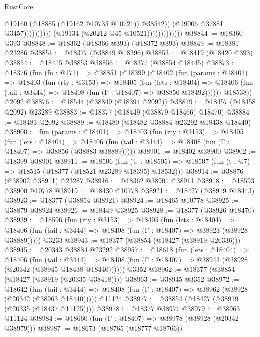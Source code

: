 \begin{lexlean}{RustCore}
\begin{coremodule}
                                                @19160
                                                (@18885 (@19162 @10735 @10721))
                                                @38542))
                                            (@19006 @37881 @3457))))))))))
                          (@19134 (@20212 @45 @10521)))))))))))))
@38844 := @18360 @393
@38848 := @18362 (@18366 @393) (@18372 @393)
@38849 := @18381 @23286
@38851 := @18377 (@38849 @18396)
@38853 := @18419 (@18420 @393)
@38854 := @18415 @38853
@38856 := @18377 (@38854 @18445)
@38873 := @18376
    (fun (fn : @171) =>
    @38851
      (@18399
        (@18402
          (fun (params : @18401) =>
          @18403
            (fun (rty : @3153) =>
            @18405
              (fun (lets : @18404) =>
              @18406 (fun (tail : @3444) => @18408 (fun (Γ : @18407) => @38856 @18492))))))
        @18538))
    @2092
@38876 := @18544 (@38849 (@18394 @2092))
@38879 := @18457 (@18458 @2092) @23289
@38883 := @18377 (@18449 (@38879 @18466) @18470)
@38884 := @18483 @2092
@38889 := @18480 (@18482 @38884 @23292 @18438 @18440)
@38900 := fun (params : @18401) =>
  @18403
    (fun (rty : @3153) =>
    @18405
      (fun (lets : @18404) =>
      @18406 (fun (tail : @3444) => @18408 (fun (Γ : @18407) => @38856 (@38883 @38889)))))
@38901 := @18402 @38900
@38902 := @18399 @38901
@38911 := @18506
    (fun (U : @18505) => @18507 (fun (t : @7) => @18515 (@18377 (@18521 @23289 @18395) @18532)))
@38914 := @38876 (@38902 @38911) @23287
@38916 := @18362 @38901 @38911
@38918 := @18593 @38900 @10778
@38919 := @18430 @10778
@38921 := @18427 (@38919 @18443)
@38923 := @18377 (@38854 @38921)
@38924 := @18465 @10778
@38925 := @38879 @38924
@38926 := @18449 @38925
@38928 := @18377 (@38926 @18470)
@38939 := @18596
    (fun (rty : @3153) =>
    @18405
      (fun (lets : @18404) =>
      @18406 (fun (tail : @3444) => @18408 (fun (Γ : @18407) => @38923 (@38928 @38889)))))
    @3233
@38943 := @18377 (@38854 (@18427 (@38919 @20336)))
@38945 := @20343 @38884 @23292
@38957 := @18618
    (fun (lets : @18404) =>
    @18406
      (fun (tail : @3444) =>
      @18408 (fun (Γ : @18407) => @38943 (@38928 (@20342 (@38945 @18438 @18440))))))
    @3352
@38962 := @18377 (@38854 (@18427 (@38919 (@20335 @38418))))
@38963 := @38945 @3352
@38972 := @18642
    (fun (tail : @3444) => @18408 (fun (Γ : @18407) => @38962 (@38928 (@20342 (@38963 @18440)))))
    @11124
@38977 := @38854 (@18427 (@38919 (@20335 (@18437 @11125))))
@38978 := @18377 @38977
@38979 := @38963 @11124
@38984 := @18660 (fun (Γ : @18407) => @38978 (@38928 (@20342 @38979)))
@38987 := @18673 (@18765 (@18777 @18766))

\end{coremodule}
\end{lexlean}
